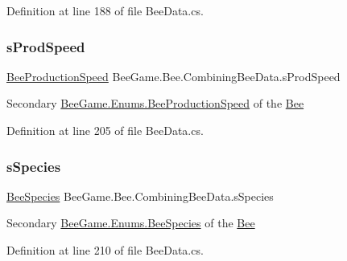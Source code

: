 Definition at line 188 of file Bee\+Data.\+cs.

\mbox{\label{struct_bee_game_1_1_bee_1_1_combining_bee_data_a253d2a55fe2cb1a3d01492a6f961b995}} 
\subsubsection{\texorpdfstring{s\+Prod\+Speed}{sProdSpeed}}
{\footnotesize\ttfamily \hyperlink{namespace_bee_game_1_1_enums_afee18200a21cc4b8e1d0cdb669930f14}{Bee\+Production\+Speed} Bee\+Game.\+Bee.\+Combining\+Bee\+Data.\+s\+Prod\+Speed}



Secondary \hyperlink{namespace_bee_game_1_1_enums_afee18200a21cc4b8e1d0cdb669930f14}{Bee\+Game.\+Enums.\+Bee\+Production\+Speed} of the \hyperlink{namespace_bee_game_1_1_bee}{Bee} 



Definition at line 205 of file Bee\+Data.\+cs.

\mbox{\label{struct_bee_game_1_1_bee_1_1_combining_bee_data_a8359d180e7a0704e81bb7f37b9aac021}} 
\subsubsection{\texorpdfstring{s\+Species}{sSpecies}}
{\footnotesize\ttfamily \hyperlink{namespace_bee_game_1_1_enums_aa2ead984825678d83c42d48f6382619c}{Bee\+Species} Bee\+Game.\+Bee.\+Combining\+Bee\+Data.\+s\+Species}



Secondary \hyperlink{namespace_bee_game_1_1_enums_aa2ead984825678d83c42d48f6382619c}{Bee\+Game.\+Enums.\+Bee\+Species} of the \hyperlink{namespace_bee_game_1_1_bee}{Bee} 



Definition at line 210 of file Bee\+Data.\+cs.

